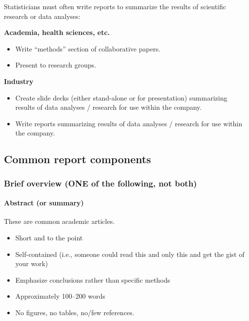 \documentclass[
  openany]{book}
\providecommand{\tightlist}{%
  \setlength{\itemsep}{0pt}\setlength{\parskip}{0pt}}
\begin{document}
Statisticians must often write reports to summarize the results of scientific research or data analyses:

\textbf{Academia, health sciences, etc.}

\begin{itemize}
\tightlist
\item
  Write ``methods'' section of collaborative papers.\\
\item
  Present to research groups.
\end{itemize}

\textbf{Industry}

\begin{itemize}
\tightlist
\item
  Create slide decks (either stand-alone or for presentation) summarizing results of data analyses / research for use within the company.\\
\item
  Write reports summarizing results of data analyses / research for use within the company.
\end{itemize}

\hypertarget{common-report-components}{%
\subsection{Common report components}\label{common-report-components}}

\hypertarget{brief-overview-one-of-the-following-not-both}{%
\subsubsection{Brief overview (ONE of the following, not both)}\label{brief-overview-one-of-the-following-not-both}}

\hypertarget{abstract-or-summary}{%
\paragraph{Abstract (or summary)}\label{abstract-or-summary}}

These are common academic articles.

\begin{itemize}
\tightlist
\item
  Short and to the point
\item
  Self-contained (i.e., someone could read this and only this and get the gist of your work)
\item
  Emphasize conclusions rather than specific methods
\item
  Approximately 100--200 words
\item
  No figures, no tables, no/few references.
\end{itemize}
\end{document}
